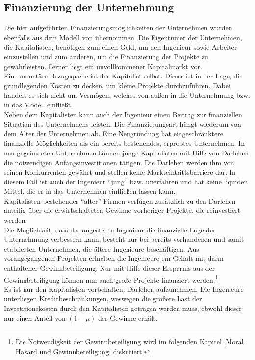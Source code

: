 \subsection{Finanzierung der Unternehmung}
Die hier aufgeführten Finanzierungsmöglichkeiten der Unternehmen wurden ebenfalls aus dem Modell von \citet{Acemoglu.2006} übernommen.
Die Eigentümer der Unternehmen, die Kapitalisten, benötigen zum einen Geld, um den Ingenieur sowie Arbeiter einzustellen und zum anderen, um die Finanzierung der Projekte zu gewährleisten. Ferner liegt ein unvollkommener Kapitalmarkt vor. \\
Eine monetäre Bezugsquelle ist der Kapitalist selbst. Dieser ist in der Lage, die grundlegenden Kosten zu decken, um kleine Projekte durchzuführen. Dabei handelt es sich nicht um Vermögen, welches von au{\ss}en in die Unternehmung bzw. in das Modell einflie{\ss}t. \\


Neben dem Kapitalisten kann auch der Ingenieur einen Beitrag zur finanziellen Situation des Unternehmens leisten. Die Finanzierungsart hängt wiederum von dem Alter der Unternehmen ab. Eine Neugründung hat eingeschränktere finanzielle Möglichkeiten als ein bereits bestehendes, erprobtes Unternehmen. In neu gegründeten Unternehmen können junge Kapitalisten  mit Hilfe von Darlehen die notwendigen Anfangsinvestitionen tätigen. Die Darlehen werden ihm von seinen Konkurrenten gewährt und stellen keine Markteintrittsbarriere dar. In diesem Fall ist auch der Ingenieur "`jung"' bzw. unerfahren und hat keine liquiden Mittel, die er in das Unternehmen einflie{\ss}en lassen kann.\\
Kapitalisten bestehender "`alter"' Firmen verfügen zusätzlich zu den Darlehen anteilig über die erwirtschafteten Gewinne vorheriger Projekte, die reinvestiert werden.\\
Die Möglichkeit, dass der angestellte Ingenieur die finanzielle Lage der Unternehmung verbessern kann, besteht nur bei bereits vorhandenen und somit etablierten Unternehmen, die ältere Ingenieure beschäftigen. Aus vorangegangenen Projekten erhielten die Ingenieure ein Gehalt mit darin enthaltener Gewinnbeteiligung. Nur mit Hilfe dieser Ersparnis aus der Gewinnbeteiligung können nun auch gro{\ss}e Projekte finanziert werden.\footnote{Die Notwendigkeit der Gewinnbeteiligung wird im folgenden Kapitel \ref{Moral Hazard und Gewinnbeteiligung} diskutiert.}\\


Es ist nur den Kapitalisten vorbehalten, Darlehen aufzunehmen. Die Ingenieure unterliegen Kreditbeschränkungen, weswegen die grö{\ss}ere Last der Investitionskosten durch den Kapitalisten getragen werden muss, obwohl dieser nur einen Anteil von $(1-\mu)$  der Gewinne erhält. 

